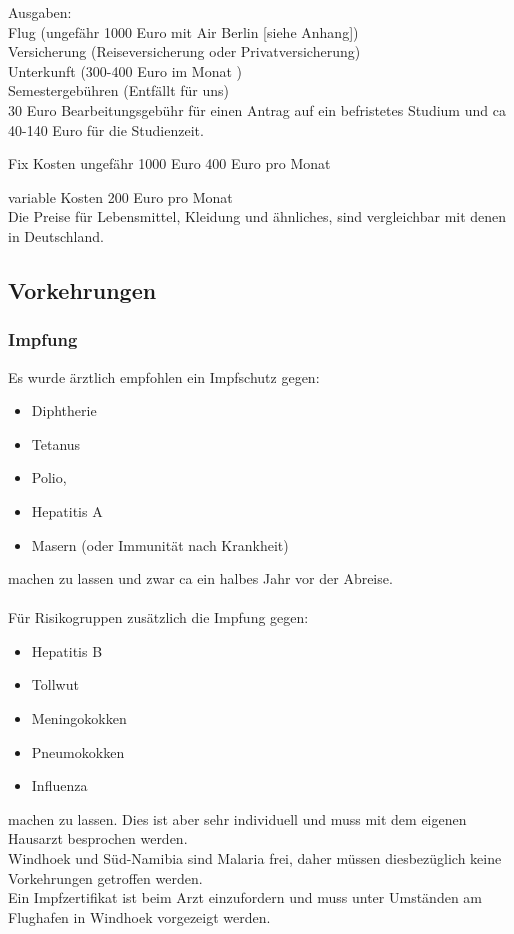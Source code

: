 \documentclass[11pt]{article}
\begin{document}
Ausgaben:\\
Flug (ungefähr 1000 Euro mit Air Berlin [siehe Anhang])\\
Versicherung (Reiseversicherung oder Privatversicherung)\\
Unterkunft (300-400 Euro im Monat )\\
Semestergebühren (Entfällt für uns)\\
30 Euro Bearbeitungsgebühr für einen Antrag auf ein befristetes Studium und ca 40-140 Euro für die Studienzeit.

Fix Kosten 		ungefähr 1000 Euro
			400 Euro pro Monat

variable Kosten 	200 Euro pro Monat\\

Die Preise für Lebensmittel, Kleidung und ähnliches, sind vergleichbar mit denen in Deutschland.

\subsection{Vorkehrungen}

\subsubsection{Impfung}
Es wurde ärztlich empfohlen ein Impfschutz gegen:
\begin{itemize}
\item Diphtherie
\item Tetanus
\item Polio,
\item Hepatitis A
\item Masern (oder Immunität nach Krankheit)
\end{itemize}
machen zu lassen und zwar ca ein halbes Jahr vor der 
Abreise. \\\\
Für Risikogruppen zusätzlich die Impfung gegen:
\begin{itemize}
\item Hepatitis B
\item Tollwut
\item Meningokokken
\item Pneumokokken
\item Influenza
\end{itemize}
 machen zu lassen. Dies ist aber sehr individuell und muss mit dem eigenen Hausarzt besprochen werden.
\\
Windhoek und Süd-Namibia sind Malaria frei, daher müssen diesbezüglich keine Vorkehrungen getroffen werden. 
\\
Ein Impfzertifikat ist beim Arzt einzufordern und muss unter Umständen am Flughafen in Windhoek vorgezeigt werden.
\end{document}
